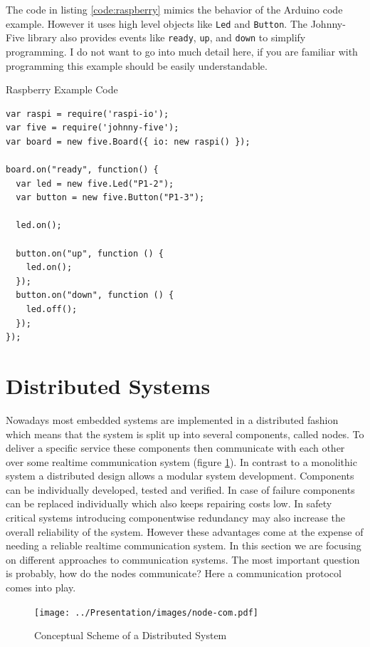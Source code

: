 \documentclass[pdftex,12pt,a4paper,fleqn]{scrartcl}
\begin{document}
The code in listing \ref{code:raspberry} mimics the behavior of the Arduino code example. However it uses high level objects like \texttt{Led} and \texttt{Button}. The Johnny-Five library also provides events like \texttt{ready}, \texttt{up}, and \texttt{down} to simplify programming. I do not want to go into much detail here, if you are familiar with programming this example should be easily understandable.

\begin{listing}[H]
\caption{Raspberry Example Code}
\label{code:raspberry}
\begin{verbatim}
var raspi = require('raspi-io');
var five = require('johnny-five');
var board = new five.Board({ io: new raspi() });
      
board.on("ready", function() {
  var led = new five.Led("P1-2");
  var button = new five.Button("P1-3");
        
  led.on();
        
  button.on("up", function () {
    led.on();
  });
  button.on("down", function () {
    led.off();
  });
});
\end{verbatim}
\end{listing}


\section{Distributed Systems}
Nowadays most embedded systems are implemented in a distributed fashion which means that the system is split up into several components, called nodes. To deliver a specific service these components then communicate with each other over some realtime communication system (figure \ref{fig:distsys}). In contrast to a monolithic system a distributed design allows a modular system development. Components can be individually developed, tested and verified. In case of failure components can be replaced individually which also keeps repairing costs low. In safety critical systems introducing componentwise redundancy may also increase the overall reliability of the system. However these advantages come at the expense of needing a reliable realtime communication system. In this section we are focusing on different approaches to communication systems. The most important question is probably, how do the nodes communicate? Here a communication protocol comes into play.

\begin{figure}[h]	
	\centering
  \texttt{[image: ../Presentation/images/node-com.pdf]}
  \caption{Conceptual Scheme of a Distributed System}
  \label{fig:distsys}
\end{figure}
\end{document}
